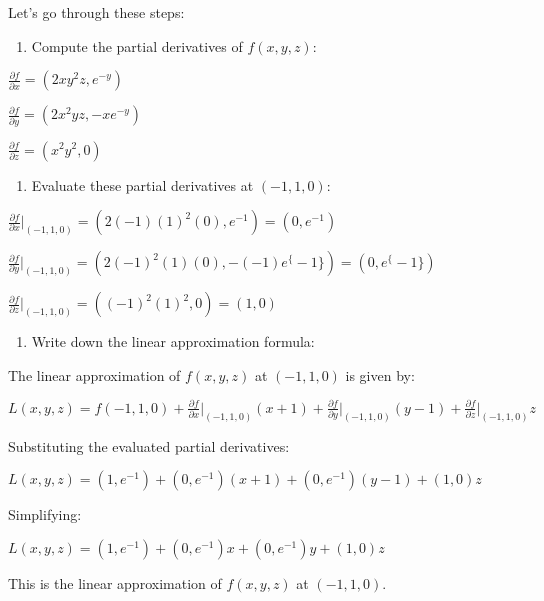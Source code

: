\documentclass[11pt]{article}
\makeatletter
\providecommand{\tightlist}{%
      \setlength{\itemsep}{0pt}\setlength{\parskip}{0pt}}
\newcommand{\boxspacing}{\kern\kvtcb@left@rule\kern\kvtcb@boxsep}
\newcommand{\prompt}[4]{
        {\ttfamily\llap{{\color{#2}[#3]:\hspace{3pt}#4}}\vspace{-\baselineskip}}
    }
\makeatother
\begin{document}
Let's go through these steps:

\begin{enumerate}
\def\labelenumi{\arabic{enumi}.}
\tightlist
\item
  Compute the partial derivatives of $ f(x, y, z) $:
\end{enumerate}

$\frac{{\partial f}}{{\partial x}} = (2xy^2z, e^{-y})$

$\frac{{\partial f}}{{\partial y}} = (2x^2yz, -xe^{-y})$

$\frac{{\partial f}}{{\partial z}} = (x^2y^2, 0)$

\begin{enumerate}
\def\labelenumi{\arabic{enumi}.}
\setcounter{enumi}{1}
\tightlist
\item
  Evaluate these partial derivatives at $(-1, 1, 0)$:
\end{enumerate}

$\frac{{\partial f}}{{\partial x}}\Bigg|_{(-1,1,0)} = (2(-1)(1)^2(0), e^{-1}) = (0, e^{-1})$

$ \frac{{\partial f}}{{\partial y}}\Bigg|_{(-1,1,0)} = (2(-1)^2(1)(0), -(-1)e^\{-1\}) = (0, e^\{-1\}) $

$\frac{{\partial f}}{{\partial z}}\Bigg|_{(-1,1,0)} = ((-1)^2(1)^2, 0) = (1, 0)$

\begin{enumerate}
\def\labelenumi{\arabic{enumi}.}
\setcounter{enumi}{2}
\tightlist
\item
  Write down the linear approximation formula:
\end{enumerate}

The linear approximation of $ f(x, y, z) $ at $(-1, 1, 0)$ is given
by:

$L(x, y, z) = f(-1, 1, 0) + \frac{{\partial f}}{{\partial x}}\Bigg|_{(-1,1,0)}(x+1) + \frac{{\partial f}}{{\partial y}}\Bigg|_{(-1,1,0)}(y-1) + \frac{{\partial f}}{{\partial z}}\Bigg|_{(-1,1,0)}z$

Substituting the evaluated partial derivatives:

$L(x, y, z) = (1, e^{-1}) + (0, e^{-1})(x+1) + (0, e^{-1})(y-1) + (1, 0)z$

Simplifying:

$L(x, y, z) = (1, e^{-1}) + (0, e^{-1})x + (0, e^{-1})y + (1, 0)z$

This is the linear approximation of $ f(x, y, z) $ at $(-1, 1, 0)$.

    \begin{tcolorbox}[breakable, size=fbox, boxrule=1pt, pad at break*=1mm,colback=cellbackground, colframe=cellborder]
\prompt{In}{incolor}{ }{\boxspacing}
\begin{Verbatim}[commandchars=\\\{\}]

\end{Verbatim}
\end{tcolorbox}
\end{document}
